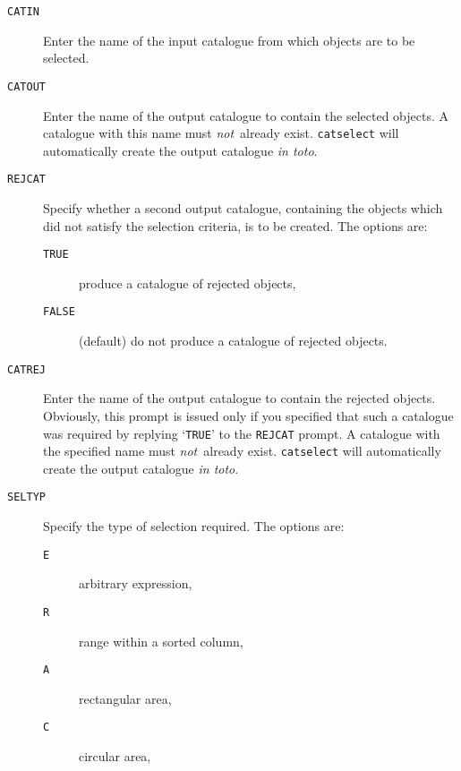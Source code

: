 \documentclass[twoside,11pt]{starlink}
\begin{document}
\begin{description}

  \item[ \texttt{CATIN} ] Enter the name of the input catalogue from which
   objects are to be selected.

  \item[ \texttt{CATOUT} ] Enter the name of the output catalogue to
   contain the selected objects.  A catalogue with this name must \textit{not}\, already exist.  \texttt{catselect} will automatically create the
   output catalogue \textit{in toto}.

  \item[ \texttt{REJCAT} ] Specify whether a second output catalogue,
   containing the objects which did not satisfy the selection criteria,
   is to be created.  The options are:

  \begin{description}

    \item[ \texttt{TRUE} ] produce a catalogue of rejected objects,

    \item[ \texttt{FALSE} ] (default) do not produce a catalogue of rejected
     objects.

  \end{description}

  \item[ \texttt{CATREJ} ] Enter the name of the output catalogue to
   contain the rejected objects.  Obviously, this prompt is issued only
   if you specified that such a catalogue was required by replying `\texttt{TRUE}' to the \texttt{REJCAT} prompt.  A catalogue with the specified name
   must \textit{not}\, already exist.  \texttt{catselect} will automatically
   create the output catalogue \textit{in toto}.

  \item[ \texttt{SELTYP} ] Specify the type of selection required.  The
   options are:

  \begin{description}

    \item[ \texttt{E} ] arbitrary expression,

    \item[ \texttt{R} ] range within a sorted column,

    \item[ \texttt{A} ] rectangular area,

    \item[ \texttt{C} ] circular area,


\end{description}
\end{description}
\end{document}
